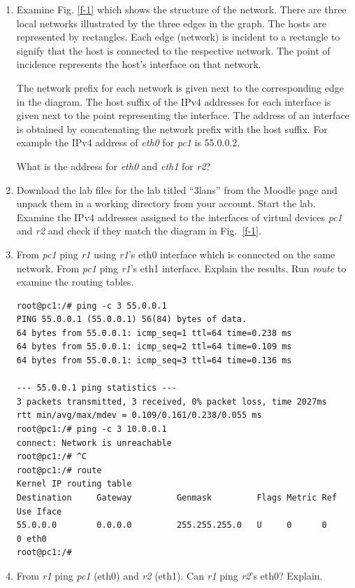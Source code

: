 \documentclass[12pt]{book}
\begin{document}
\begin{enumerate}[label=Activity \arabic*:]
\item Examine Fig. \ref{f-1} which shows the structure of the network. There are three local networks illustrated by the three edges in the graph. The hosts are represented by rectangles. Each edge (network) is incident to a rectangle to signify that the host is connected to the respective network. The point of incidence represents the host's interface on that network.

  The network prefix for each network is given next to the corresponding edge in the diagram. The host suffix of the IPv4 addresses for each interface is given next to the point representing the interface. The address of an interface is obtained by concatenating the network prefix with the host suffix. For example the IPv4 address of \emph{eth0} for \emph{pc1} is 55.0.0.2.

  What is the address for \emph{eth0} and \emph{eth1} for \emph{r2}?

\item Download the lab files for the lab titled ``3lans'' from the Moodle page and unpack them in a working directory from your account. Start the lab. Examine the IPv4 addresses assigned to the interfaces of virtual devices \emph{pc1} and \emph{r2} and check if they match the diagram in Fig.~\ref{f-1}.

\item From \emph{pc1} ping \emph{r1} using \emph{r1}'s eth0 interface which is connected on the same network. From \emph{pc1} ping \emph{r1}'s eth1 interface. Explain the results. Run \emph{route} to examine the routing tables.
  \begin{lstlisting}
root@pc1:/# ping -c 3 55.0.0.1
PING 55.0.0.1 (55.0.0.1) 56(84) bytes of data.
64 bytes from 55.0.0.1: icmp_seq=1 ttl=64 time=0.238 ms
64 bytes from 55.0.0.1: icmp_seq=2 ttl=64 time=0.109 ms
64 bytes from 55.0.0.1: icmp_seq=3 ttl=64 time=0.136 ms

--- 55.0.0.1 ping statistics ---
3 packets transmitted, 3 received, 0% packet loss, time 2027ms
rtt min/avg/max/mdev = 0.109/0.161/0.238/0.055 ms
root@pc1:/# ping -c 3 10.0.0.1
connect: Network is unreachable
root@pc1:/# ^C
root@pc1:/# route
Kernel IP routing table
Destination     Gateway         Genmask         Flags Metric Ref    Use Iface
55.0.0.0        0.0.0.0         255.255.255.0   U     0      0        0 eth0
root@pc1:/#
  \end{lstlisting}

\item From \emph{r1} ping \emph{pc1} (eth0) and \emph{r2} (eth1). Can \emph{r1} ping \emph{r2}'s eth0? Explain. 


\end{enumerate}
\end{document}
